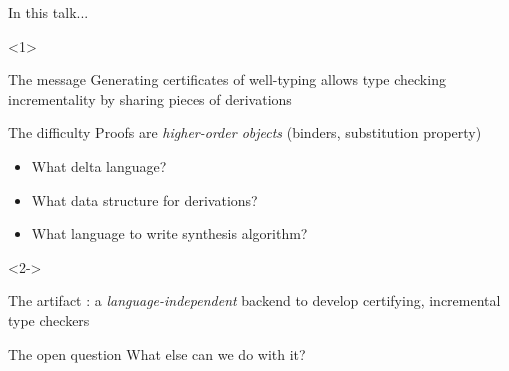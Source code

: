 \begin{frame}{In this talk...}

  \begin{onlyenv}<1>
    \begin{block}{The message}
      Generating certificates of well-typing allows type checking
      incrementality by sharing pieces of derivations
    \end{block}

  \begin{block}{The difficulty}
    Proofs are \emph{higher-order objects} (binders, substitution
    property)
    \begin{itemize}
    \item What delta language?
    \item What data structure for derivations?
    \item What language to write synthesis algorithm?
    \end{itemize}
  \end{block}
\end{onlyenv}

\begin{onlyenv}<2->
  \begin{block}{The artifact}
    : a \emph{language-independent} backend to develop
    certifying, incremental type checkers
    \begin{figure}
      \centering
    \end{figure}
  \end{block}
  \begin{block}{The open question}
    What else can we do with it?
  \end{block}
\end{onlyenv}
\end{frame}

